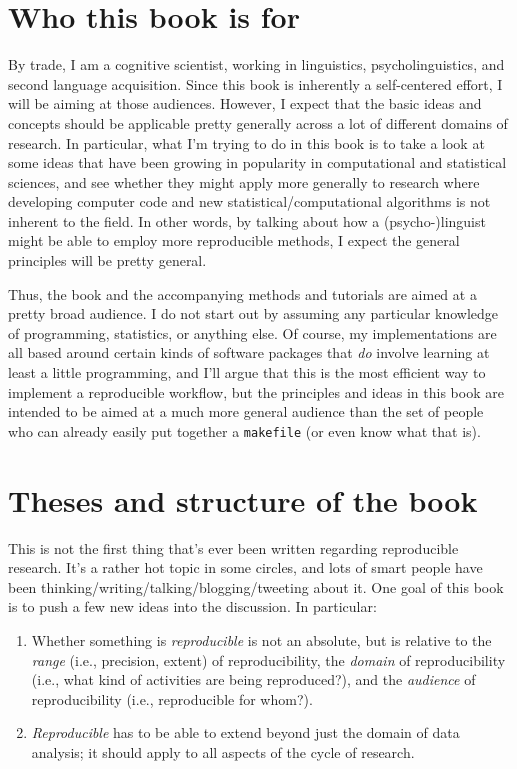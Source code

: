 \documentclass{book}
\begin{document}
\section{Who this book is for}
\label{sec-1-4}

By trade, I am a cognitive scientist, working in linguistics, psycholinguistics, and second language acquisition. Since this book is inherently a self-centered effort, I will be aiming at those audiences. However, I expect that the basic ideas and concepts should be applicable pretty generally across a lot of different domains of research. In particular, what I'm trying to do in this book is to take a look at some ideas that have been growing in popularity in computational and statistical sciences, and see whether they might apply more generally to research where developing computer code and new statistical/computational algorithms is not inherent to the field. In other words, by talking about how a (psycho-)linguist might be able to employ more reproducible methods, I expect the general principles will be pretty general.

Thus, the book and the accompanying methods and tutorials are aimed at a pretty broad audience. I do not start out by assuming any particular knowledge of programming, statistics, or anything else. Of course, my implementations are all based around certain kinds of software packages that \emph{do} involve learning at least a little programming, and I'll argue that this is the most efficient way to implement a reproducible workflow, but the principles and ideas in this book are intended to be aimed at a much more general audience than the set of people who can already easily put together a \texttt{makefile} (or even know what that is).
\section{Theses and structure of the book}
\label{sec-1-5}

This is not the first thing that's ever been written regarding reproducible research. It's a rather hot topic in some circles, and lots of smart people have been thinking/writing/talking/blogging/tweeting about it. One goal of this book is to push a few new ideas into the discussion. In particular:

\begin{enumerate}
\item Whether something is \emph{reproducible} is not an absolute, but is relative to the \emph{range} (i.e., precision, extent) of reproducibility, the \emph{domain} of reproducibility (i.e., what kind of activities are being reproduced?), and the \emph{audience} of reproducibility (i.e., reproducible for whom?).
\item \emph{Reproducible} has to be able to extend beyond just the domain of data analysis; it should apply to all aspects of the cycle of research.
\end{enumerate}
\end{document}
